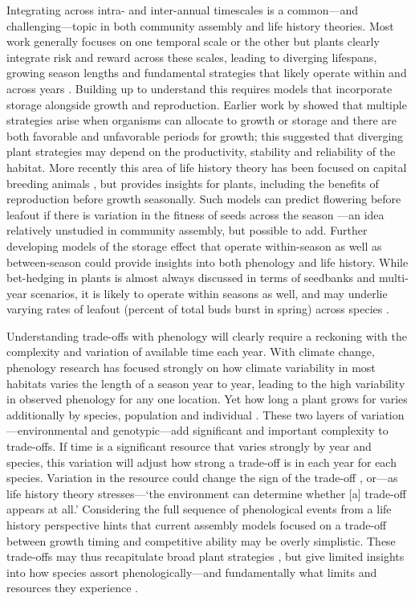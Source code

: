 \documentclass[11pt]{article}
\begin{document}
Integrating across intra- and inter-annual timescales is a common---and challenging---topic in both community assembly and life history theories. Most work generally focuses on one temporal scale or the other but plants clearly integrate risk and reward across these scales, leading to diverging lifespans, growing season lengths and fundamental strategies that likely operate within and across years \citep{bazzaz1987allocating}. Building up to understand this requires models that incorporate storage alongside growth and reproduction. Earlier work by \citet{iwasa1989optimal} showed that multiple strategies arise when organisms can allocate to growth or storage and there are both favorable and unfavorable periods for growth; this suggested that diverging plant strategies may depend on the productivity, stability and reliability of the habitat. More recently this area of life history theory has been focused on capital breeding animals \citep[e.g.,][]{varpe2009adaptive}, but provides insights for plants, including the benefits of reproduction before growth seasonally. Such models can predict flowering before leafout if there is variation in the fitness of seeds across the season \citep{ejsmond2010time}---an idea relatively unstudied in community assembly, but possible to add. Further developing models of the storage effect that operate within-season as well as between-season could provide insights into both phenology and life history. While bet-hedging in plants is almost always discussed in terms of seedbanks and multi-year scenarios, it is likely to operate within seasons as well, and may underlie varying rates of leafout (percent of total buds burst in spring) across species \citep{baumgarten2021chilled}. 

Understanding trade-offs with phenology will clearly require a reckoning with the complexity and variation of available time each year. With climate change, phenology research has focused strongly on how climate variability in most habitats varies the length of a season year to year, leading to the high variability in observed phenology for any one location. Yet how long a plant grows for varies additionally by species, population and individual \citep{ettinger2018phenological,korner2023four}. These two layers of variation---environmental and genotypic---add significant and important complexity to trade-offs. If time is a significant resource that varies strongly by year and species, this variation will adjust how strong a trade-off is in each year for each species. Variation in the resource could change the sign of the trade-off \citep{van1986acquisition}, or---as life history theory stresses---`the environment can determine whether [a] trade-off appears at all.' Considering the full sequence of phenological events from a life history perspective hints that current assembly models focused on a trade-off between growth timing and competitive ability may be overly simplistic. These trade-offs may thus recapitulate broad plant strategies \citep{grime1977evidence}, but give limited insights into how species assort phenologically---and fundamentally what limits and resources they experience \citep{stanton2000}. 
\end{document}
